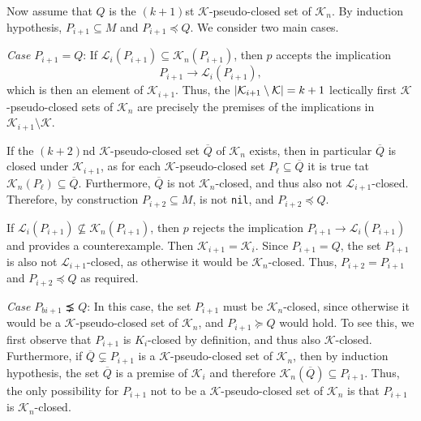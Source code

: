 \begin{Proof}
  Now assume that $Q$ is the $(k+1)$st $\mathcal{K}$-pseudo-closed set of
  $\mathcal{K}_{n}$.  By induction hypothesis, $P_{i+1} \subseteq M$ and $P_{i+1} \preceq
  Q$.  We consider two main cases.

  \textit{Case $P_{i+1} = Q$}:  If $\mathcal{L}_{i}(P_{i+1}) \subseteq
  \mathcal{K}_{n}(P_{i+1})$, then $p$ accepts the implication
  \begin{equation*}
    P_{i+1} \to \mathcal{L}_{i}(P_{i+1}),
  \end{equation*}
  which is then an element of $\mathcal{K}_{i+1}$.  Thus, the $\lvert \mathcal{K}_{i+1}
    \setminus \mathcal{K} \rvert = k + 1$ lectically first $\mathcal{K}$-pseudo-closed sets of
  $\mathcal{K}_{n}$ are precisely the premises of the implications in $\mathcal{K}_{i+1}
  \setminus \mathcal{K}$.

  If the $(k+2)$nd $\mathcal{K}$-pseudo-closed set $\overline Q$ of $\mathcal{K}_{n}$
  exists, then in particular $\overline Q$ is closed under $\mathcal{K}_{i+1}$, as for
  each $\mathcal{K}$-pseudo-closed set $P_{\ell} \subseteq \overline Q$ it is true tat
  $\mathcal{K}_{n}(P_{\ell}) \subseteq \overline Q$.  Furthermore, $\overline Q$ is not
  $\mathcal{K}_{n}$-closed, and thus also not $\mathcal{L}_{i+1}$-closed.  Therefore, by
  construction $P_{i+2} \subseteq M$, \ie is not \lstinline{nil}, and $P_{i+2} \preceq Q$.

  If $\mathcal{L}_{i}(P_{i+1}) \not\subseteq \mathcal{K}_{n}(P_{i+1})$, then $p$ rejects
  the implication $P_{i+1} \to \mathcal{L}_{i}(P_{i+1})$ and provides a counterexample.
  Then $\mathcal{K}_{i+1} = \mathcal{K}_{i}$.  Since $P_{i+1} = Q$, the set $P_{i+1}$ is
  also not $\mathcal{L}_{i+1}$-closed, as otherwise it would be $\mathcal{K}_{n}$-closed.
  Thus, $P_{i+2} = P_{i+1}$ and $P_{i+2} \preceq Q$ as required.

  \textit{Case $P_{bi+1} \precneq Q$}: In this case, the set $P_{i+1}$ must be
  $\mathcal{K}_{n}$-closed, since otherwise it would be a $\mathcal{K}$-pseudo-closed set
  of $\mathcal{K}_{n}$, and $P_{i+1} \succeq Q$ would hold.  To see this, we first observe
  that $P_{i+1}$ is $K_{i}$-closed by definition, and thus also $\mathcal{K}$-closed.
  Furthermore, if $\overline Q \subsetneq P_{i+1}$ is a $\mathcal{K}$-pseudo-closed set of
  $\mathcal{K}_{n}$, then by induction hypothesis, the set $\overline Q$ is a premise of
  $\mathcal{K}_{i}$ and therefore $\mathcal{K}_{n}(\overline Q) \subseteq P_{i+1}$.  Thus,
  the only possibility for $P_{i+1}$ not to be a $\mathcal{K}$-pseudo-closed set of
  $\mathcal{K}_{n}$ is that $P_{i+1}$ is $\mathcal{K}_{n}$-closed.


\end{Proof}
